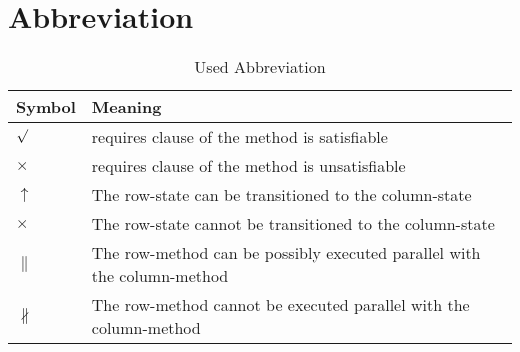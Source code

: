 \documentclass[10pt]{article}
\begin{document}
\section{{\color{Fuchsia}Abbreviation}}
\label{Abbreviation}
\begin{longtable}{|l|l|}
\caption{Used Abbreviation}\\
\hline
Symbol & Meaning\\
\hline
{\color{blue}$\surd$}&requires clause of the method is satisfiable\\
\hline
{\color{red}$\times$}&requires clause of the method is unsatisfiable\\
\hline
{\color{blue}$\uparrow$}&The row-state can be transitioned to the column-state\\
\hline
{\color{BlueGreen}$\times$}&The row-state cannot be transitioned to the column-state\\
\hline
{\color{blue}$\parallel$}&The row-method can be possibly executed parallel with the column-method\\
\hline
{\color{BrickRed}$\nparallel$}&The row-method cannot be executed parallel with the column-method\\
\hline
\end{longtable}
\newpage
\end{document}
